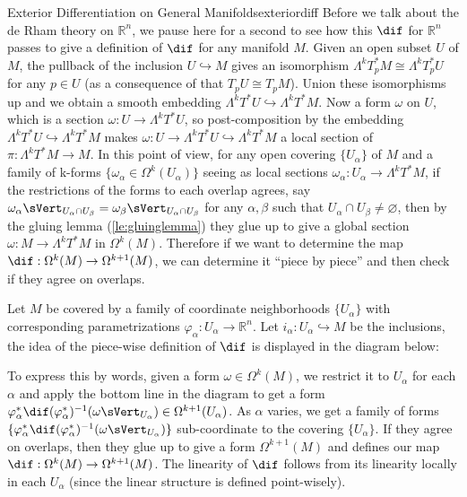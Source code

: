 \documentclass[11pt, a3paper, openany]{article}
\theoremstyle{remark}
\theoremstyle{remark}
\theoremstyle{remark}
\newenvironment{Proof of claim}
  {\begin{proof}[\normalfont \textbf{Proof of claim}]}
  {\end{proof}}
\theoremstyle{definition}
\theoremstyle{remark}
\theoremstyle{plain}
\begin{document}
\begin{Remark}{Exterior Differentiation on General Manifolds}{exteriordiff}
Before we talk about the de Rham theory on $\mathbb{R}^n$, we pause here for a second to see how this $\dif $ for $\mathbb{R}^n$ passes to give a definition of $\dif$ for any manifold $M$. Given an open subset $U$ of $M$, the pullback of the inclusion $U\hookrightarrow M$ gives an isomorphism $\Lambda^k T_p^*M \cong \Lambda^k T_p^* U$ for any $p\in U$ (as a consequence of that $T_pU\cong T_p M$). Union these isomorphisms up and we obtain a smooth embedding $\Lambda^k T^*U\hookrightarrow \Lambda^k T^*M $. Now a form $\omega$ on $U$, which is a section $\omega:U\to \Lambda^k T^*U$, so post-composition by the embedding $\Lambda^k T^*U\hookrightarrow \Lambda^k T^*M $ makes $\omega: U\to \Lambda^k T^*U\hookrightarrow \Lambda^k T^*M $ a local section of $\pi: \Lambda^k T^*M \to M$. In this point of view, for any open covering $\{U_\alpha\}$ of $M$ and a family of k-forms $\{\omega_\alpha\in \Omega^k(U_\alpha)\}$ seeing as local sections $\omega_\alpha:U_\alpha\to \Lambda^k T^*M$, if the restrictions of the forms to each overlap agrees, say $\omega_\alpha \sVert_{U_\alpha\cap U_\beta}=\omega_\beta\sVert_{U_\alpha\cap U_\beta}$ for any $\alpha,\beta$ such that $U_\alpha\cap U_\beta\neq \varnothing$, then by the gluing lemma (\cref{le:gluinglemma}) they glue up to give a global section $\omega:M\to \Lambda^k T^*M$ in $\Omega^k(M)$. Therefore if we want to determine the map $\dif :\Omega^k(M)\to \Omega^{k+1}(M)$, we can determine it ``piece by piece'' and then check if they agree on overlaps.\par
Let $M$ be covered by a family of coordinate neighborhoods $\{U_\alpha\}$ with corresponding parametrizations $\varphi_\alpha:U_\alpha\to \mathbb{R}^n$. Let $i_\alpha:U_\alpha\hookrightarrow M$ be the inclusions, the idea of the piece-wise definition of $\dif$ is displayed in the diagram below:
\begin{center}
\end{center}
To express this by words, given a form $\omega\in \Omega^k(M)$, we restrict it to $U_\alpha$ for each $\alpha$ and apply the bottom line in the diagram to get a form $\varphi_\alpha^*\dif(\varphi_\alpha^*)^{-1}(\omega\sVert_{U_\alpha})\in \Omega^{k+1}(U_\alpha)$. As $\alpha$ varies, we get a family of forms $\{ \varphi_\alpha^*\dif(\varphi_\alpha^*)^{-1}(\omega\sVert_{U_\alpha})\}$ sub-coordinate to the covering $\{U_\alpha\}$. If they agree on overlaps, then they glue up to give a form $\Omega^{k+1}(M)$ and defines our map $\dif :\Omega^k(M)\to \Omega^{k+1}(M)$. The linearity of $\dif$ follows from its linearity locally in each $U_\alpha$ (since the linear structure is defined point-wisely). \par

\end{Remark}
\end{document}
